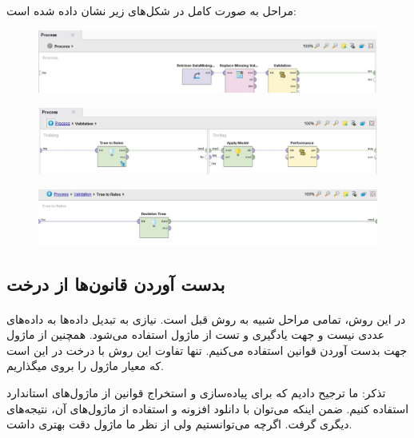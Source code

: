 \documentclass[a4paper,12pt]{article}
\begin{document}
مراحل به صورت کامل در شکل‌های زیر نشان داده شده است:
\begin{figure}[!h]
  \includegraphics[width=\linewidth]{1.jpg}
  \caption{}
    \label{tab:example}
\end{figure}
\begin{figure}[!h]
  \includegraphics[width=\linewidth]{2.jpg}
    \caption{}
    \label{tab:example}
\end{figure}
\begin{figure}[!h]
  \includegraphics[width=\linewidth]{3.jpg}
    \caption{}
    \label{tab:example}
\end{figure}

\newpage
\subsection{بدست آوردن قانون‌ها از درخت }
\paragraph{}
در این روش، تمامی مراحل شبیه به روش قبل است. نیازی به تبدیل داده‌ها به داده‌های عددی نیست و جهت یادگیری و تست از ماژول  استفاده می‌شود. همچنین از ماژول  جهت بدست آوردن قوانین استفاده می‌کنیم. تنها تفاوت این روش با درخت  در این است که معیار ماژول  را بروی  میگذاریم.


تذکر: ما ترجیح دادیم که برای پیاده‌سازی و استخراج قوانین از ماژول‌های استاندارد  استفاده کنیم. ضمن اینکه می‌توان با دانلود افزونه  و استفاده از ماژول‌های آن، نتیجه‌های دیگری گرفت. اگرچه می‌توانستیم ولی از نظر ما ماژول  دقت بهتری داشت.
\end{document}
